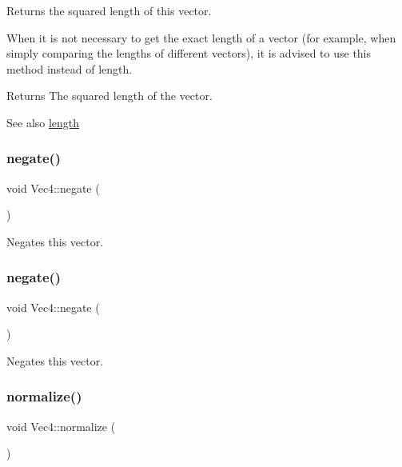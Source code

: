 Returns the squared length of this vector.

When it is not necessary to get the exact length of a vector (for example, when simply comparing the lengths of different vectors), it is advised to use this method instead of length.

\begin{DoxyReturn}{Returns}
The squared length of the vector.
\end{DoxyReturn}
\begin{DoxySeeAlso}{See also}
\hyperlink{classVec4_ac42249851a68eaf15815285b76763058}{length} 
\end{DoxySeeAlso}
\mbox{\label{classVec4_a3d83bd288450da743e021507acc41f48}} 
\subsubsection{\texorpdfstring{negate()}{negate()}\hspace{0.1cm}{\footnotesize\ttfamily [1/2]}}
{\footnotesize\ttfamily void Vec4\+::negate (\begin{DoxyParamCaption}{ }\end{DoxyParamCaption})}

Negates this vector. \mbox{\label{classVec4_a3d83bd288450da743e021507acc41f48}} 
\subsubsection{\texorpdfstring{negate()}{negate()}\hspace{0.1cm}{\footnotesize\ttfamily [2/2]}}
{\footnotesize\ttfamily void Vec4\+::negate (\begin{DoxyParamCaption}{ }\end{DoxyParamCaption})}

Negates this vector. \mbox{\label{classVec4_aecf9d5a3003c2a443098b4d80bc9dea6}} 
\subsubsection{\texorpdfstring{normalize()}{normalize()}\hspace{0.1cm}{\footnotesize\ttfamily [1/2]}}
{\footnotesize\ttfamily void Vec4\+::normalize (\begin{DoxyParamCaption}{ }\end{DoxyParamCaption})}

